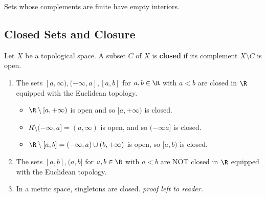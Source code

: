 \begin{remark}
    Sets whose complements are finite have empty interiors.
\end{remark}

\subsection{Closed Sets and Closure}

\begin{definition}[Closed]
    Let \( X  \) be a topological space. A subset \( C  \) of \( X  \) is \textbf{closed} if its complement \( X \setminus  C  \) is open.
\end{definition}

\begin{eg}
    \begin{enumerate}
        \item[(i)] The sets \( [a,\infty) , (- \infty , a ] , [a,b]  \) for \( a,b \in \R  \) with \( a < b  \) are closed in \( \R  \) equipped with the Euclidean topology.
    \begin{itemize}
        \item \( \R \setminus  [a,+\infty) \) is open and so \( [a,+ \infty) \) is closed.
        \item \( R \setminus  (-\infty , a ]  = (a,\infty) \) is open, and so \( (-\infty  a ]  \) is closed.
        \item  \( \R \setminus  [a,b] = (-\infty , a) \cup (b,+\infty ) \) is open, so \( [a,b) \) is closed.
    \end{itemize}
        \item[(ii)] The sets \( [a,b] , (a,b]  \) for \( a,b \in \R  \) with \( a < b  \) are NOT closed in \( \R  \) equipped with the Euclidean topology.
        \item[(iii)] In a metric space, singletons are closed. \textit{proof left to reader.} 
    \end{enumerate}
\end{eg}

